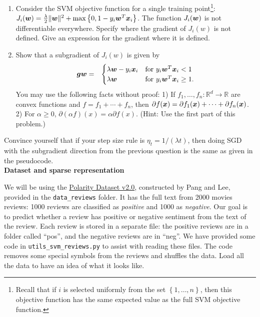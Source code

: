 \documentclass{article}
\newcommand{\wipcom}[1]{\textcolor{red}{WIP: #1}}
\newcommand{\nyuparagrah}[1]{\textcolor{nyupurple}{\large #1}}
\theoremstyle{plain}
\theoremstyle{definition}
\begin{document}
\begin{enumerate}
  \setcounter{enumi}{\value{saveenum}}
\item Consider the SVM objective function for a single training point\footnote{Recall that if $i$ is selected uniformly from the set $\left\{ 1,\ldots,n\right\} $,
then this objective function has the same expected value
as the full SVM objective function.}: $J_{i}(\boldsymbol{w})=\frac{\lambda}{2}\|\boldsymbol{w}\|^{2}+\max\left\{ 0,1-y_{i}\boldsymbol{w}^{T}\boldsymbol{x}_{i}\right\} $.
The function $J_{i}(\boldsymbol{w})$ is not differentiable everywhere. Specify where the gradient of $J_{i}(w)$ is not defined. Give an expression for the gradient where it is defined.\\

\item Show that a subgradient of $J_{i}(w)$ is given by 
\begin{eqnarray*}
\boldsymbol{g}{\boldsymbol{w}} & = & \begin{cases}
\lambda \boldsymbol{w}-y_{i}\boldsymbol{x}_{i} & \mbox{for }y_{i}\boldsymbol{w}^{T}\boldsymbol{x}_{i}<1\\
\lambda \boldsymbol{w} & \mbox{for }y_{i}\boldsymbol{w}^{T}\boldsymbol{x}_{i}\ge1.
\end{cases}
\end{eqnarray*}
You may use the following facts without proof: 1) If $f_{1},\ldots,f_{n}:\mathbb{R}^{d}\to\mathbb{R}$
are convex functions and $f=f_{1}+\cdots+f_{n}$, then $\partial f(\boldsymbol{x})=\partial f_{1}(\boldsymbol{x})+\cdots+\partial f_{n}(\boldsymbol{x})$.
2) For $\alpha\ge0$, $\partial\left(\alpha f\right)(x)=\alpha\partial f(x)$.
(Hint: Use the 
first part of this problem.)
\setcounter{saveenum}{\value{enumi}}
\end{enumerate}

Convince yourself that if your step size rule is $\eta_{t}=1/\left(\lambda t\right)$,
then doing SGD with the subgradient direction from the previous question
is the same as given in the pseudocode. \\


\nyuparagrah{\bf Dataset and sparse representation} 

We will be using the \href{https://www.cs.cornell.edu/people/pabo/movie-review-data/}{Polarity Dataset v2.0},
constructed by Pang and Lee, provided in the \texttt{data\_reviews} folder. It has the full text from 2000 movies
reviews: 1000 reviews are classified as \emph{positive} and 1000 as
\emph{negative}. Our goal is to predict whether a review has positive
or negative sentiment from the text of the review. Each review is
stored in a separate file: the positive reviews are in a folder called
``pos'', and the negative reviews are in ``neg''. We have provided
some code in \texttt{utils\_svm\_reviews.py} to assist with reading these files.
The code removes
some special symbols from the reviews and shuffles the data.
Load all the data to have an idea of what it looks like.
\end{document}
